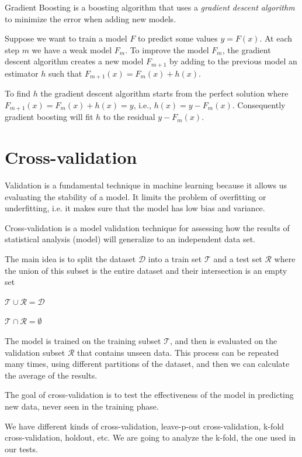 Gradient Boosting is a boosting algorithm that uses a \textit{gradient descent algorithm} to minimize the error when adding new models.

Suppose we want to train a model $F$ to predict some values $y = F(x)$. At each step $m$ we have a weak model $F_m$. To improve the model $F_m$, the gradient descent algorithm creates a new model $F_{m+1}$ by adding to the previous model an estimator $h$ such that $F_{m+1}(x) = F_m(x) + h(x)$. \cite{gradientBoostLi}

To find $h$ the gradient descent algorithm starts from the perfect solution where $F_{m+1}(x) = F_m(x) + h(x) = y$, i.e., $h(x) = y - F_m(x)$. Consequently gradient boosting will fit $h$ to the residual $y - F_m(x)$.


\section{Cross-validation}
\label{sec:cv}

Validation is a fundamental technique in machine learning because it allows us evaluating the stability of a model. It limits the problem of overfitting or underfitting, i.e. it makes sure that  the model has low bias and variance.

Cross-validation is a model validation technique for assessing how the results of statistical analysis (model) will generalize to an independent data set.

The main idea is to split the dataset $\mathcal{D}$ into a train set $\mathcal{T}$ and a test set $\mathcal{R}$ where the union of this subset is the entire dataset and their intersection is an empty set \cite{ghojogh2019theory}

 $\mathcal{T} \cup \mathcal{R} = \mathcal{D} $
 
 $\mathcal{T} \cap \mathcal{R} = \emptyset $
 

The model is trained on the training subset $\mathcal{T}$, and then is evaluated on the validation subset $\mathcal{R}$ that contains unseen data.
This process can be repeated many times, using different partitions of the dataset, and then we can calculate the average of the results.

The goal of cross-validation is to test the effectiveness of the model in predicting new data, never seen in the training phase.

We have different kinds of cross-validation, leave-p-out cross-validation, k-fold cross-validation, holdout, etc. We are going to analyze the k-fold, the one used in our tests.





